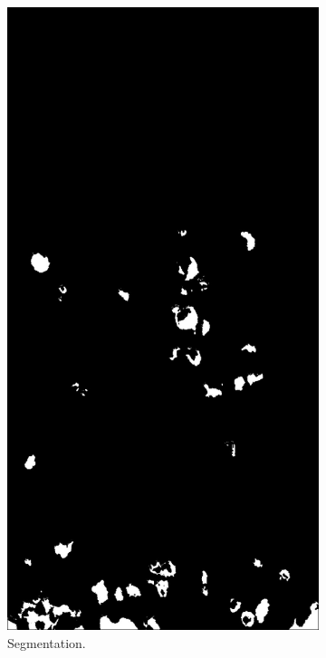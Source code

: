 \begin{figure}[!hbpt]
\begin{subfigure}[b]{.23 \textwidth}
            \includegraphics[width=\textwidth]{figures/detection/pipeline5.jpg}                  
        \caption{Segmentation.}       
        \label{fig:pipe4}        
        \end{subfigure}\hspace{.2cm} \begin{subfigure}[b]{.23 \textwidth}

\end{subfigure}
\end{figure}
